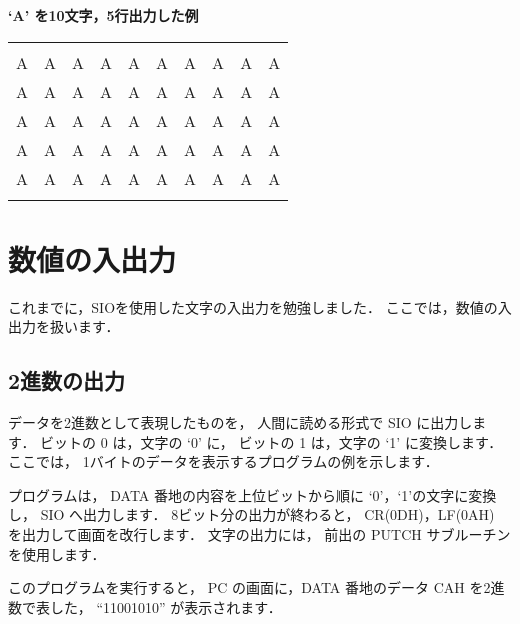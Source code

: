 {\small
\begin{center}
{\bf `A' を10文字，5行出力した例}\\
\begin{tabular}{| l l l l l l l l l l |}
\hline
  &   &   &   &   &   &   &   &   &   \\
A & A & A & A & A & A & A & A & A & A \\
A & A & A & A & A & A & A & A & A & A \\
A & A & A & A & A & A & A & A & A & A \\
A & A & A & A & A & A & A & A & A & A \\
A & A & A & A & A & A & A & A & A & A \\
  &   &   &   &   &   &   &   &   &   \\
\hline
\end{tabular}
\end{center}
}

\newpage
\section{数値の入出力}

これまでに，SIOを使用した文字の入出力を勉強しました．
ここでは，数値の入出力を扱います．

\subsection{2進数の出力}

データを2進数として表現したものを，
人間に読める形式で SIO に出力します．
ビットの 0 は，文字の `0' に，
ビットの 1 は，文字の `1' に変換します．
ここでは，
1バイトのデータを表示するプログラムの例を示します．

プログラムは，
DATA 番地の内容を上位ビットから順に `0'，`1'の文字に変換し，
SIO へ出力します．
8ビット分の出力が終わると，
CR(0DH)，LF(0AH) を出力して画面を改行します．
文字の出力には，
前出の PUTCH サブルーチンを使用します．

このプログラムを実行すると，
PC の画面に，DATA 番地のデータ CAH を2進数で表した，
``11001010'' が表示されます．

